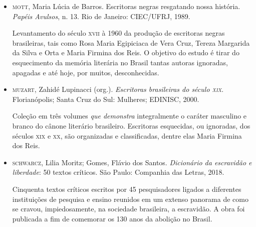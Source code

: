 \documentclass[12pt]{extarticle}
\begin{document}
\begin{itemize}
\item\textsc{mott}, Maria Lúcia de Barros. Escritoras negras resgatando nossa
história. \emph{Papéis Avulsos}, n. 13. Rio de Janeiro: CIEC/UFRJ, 1989.

Levantamento do século \textsc{xvii} à 1960 da produção de escritoras negras
brasileiras, tais como Rosa Maria Egipiciaca de Vera Cruz, Tereza
Margarida da Silva e Orta e Maria Firmina dos Reis. O objetivo do estudo
é tirar do esquecimento da memória literária no Brasil tantas autoras
ignoradas, apagadas e até hoje, por muitos, desconhecidas.

\item\textsc{muzart}, Zahidé Lupinacci (org.). \emph{Escritoras brasileiras do século
\textsc{xix}}. Florianópolis; Santa Cruz do Sul: Mulheres; EDINISC, 2000.

Coleção em três volumes \emph{que demonstra} integralmente o caráter
masculino e branco do cânone literário brasileiro. Escritoras
esquecidas, ou ignoradas, dos séculos \textsc{xix} e \textsc{xx}, são organizadas e
classificadas, dentre elas Maria Firmina dos Reis.

\item\textsc{schwarcz}, Lilia Moritz; Gomes, Flávio dos Santos. \emph{Dicionário da
escravidão e liberdade}: 50 textos críticos. São Paulo: Companhia das
Letras, 2018. 

Cinquenta textos críticos escritos por 45 pesquisadores ligados a
diferentes instituições de pesquisa e ensino reunidos em um extenso
panorama de como se cravou, impiedosamente, na sociedade brasileira, a
escravidão. A obra foi publicada a fim de comemorar os 130 anos da
abolição no Brasil.
\end{itemize}
\end{document}
